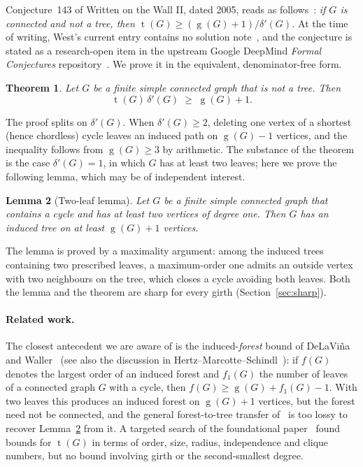 \documentclass[11pt]{article}
\numberwithin{equation}{section}
\newtheorem{theorem}{Theorem}[section]
\newtheorem{lemma}[theorem]{Lemma}
\theoremstyle{remark}
\newcommand{\tr}{\operatorname{t}}
\newcommand{\gr}{\operatorname{g}}
\newcommand{\dd}{\delta'}
\begin{document}
Conjecture~143 of Written on the Wall II, dated 2005, reads as
follows~\cite{WestReg}: \emph{if $G$ is connected and not a tree, then
$\tr(G)\ge(\gr(G)+1)/\dd(G)$.}  At the time of writing, West's current
entry contains no solution note~\cite{WestReg}, and the conjecture is stated
as a research-open item in the upstream Google DeepMind \emph{Formal
Conjectures} repository~\cite{FC,FC143}.  We prove it in the equivalent,
denominator-free form.

\begin{theorem}\label{thm:main}
Let $G$ be a finite simple connected graph that is not a tree.  Then
\[
  \tr(G)\,\dd(G)\;\ge\;\gr(G)+1 .
\]
\end{theorem}

The proof splits on $\dd(G)$.  When $\dd(G)\ge2$, deleting one vertex of a
shortest (hence chordless) cycle leaves an induced path on $\gr(G)-1$ vertices,
and the inequality follows from $\gr(G)\ge3$ by arithmetic.  The substance of
the theorem is the case $\dd(G)=1$, in which $G$ has at least two leaves; here
we prove the following lemma, which may be of independent interest.

\begin{lemma}[Two-leaf lemma]\label{lem:twoleaf-intro}
Let $G$ be a finite simple connected graph that contains a cycle and has at
least two vertices of degree one.  Then $G$ has an induced tree on at least
$\gr(G)+1$ vertices.
\end{lemma}

The lemma is proved by a maximality argument: among the induced trees
containing two prescribed leaves, a maximum-order one admits an outside vertex
with two neighbours on the tree, which closes a cycle avoiding both leaves.
Both the lemma and the theorem are sharp for every girth
(Section~\ref{sec:sharp}).

\paragraph{Related work.}
The closest antecedent we are aware of is the induced-\emph{forest} bound of
DeLaVi\~na and Waller~\cite{DW04} (see also the discussion in
Hertz--Marcotte--Schindl~\cite{HMS14}): if $f(G)$ denotes the largest order of
an induced forest and $f_1(G)$ the number of leaves of a connected graph $G$
with a cycle, then $f(G)\ge\gr(G)+f_1(G)-1$.  With two leaves this produces an
induced forest on $\gr(G)+1$ vertices, but the forest need not be connected,
and the general forest-to-tree transfer of~\cite[Theorem~2.3]{HMS14} is too
lossy to recover Lemma~\ref{lem:twoleaf-intro} from it.  A targeted search of
the foundational paper~\cite{ESS86} found bounds for $\tr(G)$ in terms of
order, size, radius, independence and clique numbers, but no bound involving
girth or the second-smallest degree.
\end{document}

